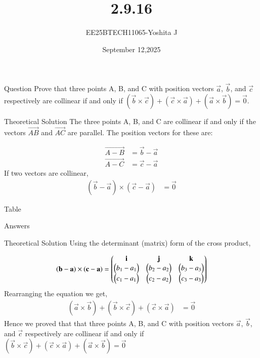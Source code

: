 \documentclass{beamer}
\begin{document}
\title 
{2.9.16}
\date{September 12,2025}


\author 
{EE25BTECH11065-Yoshita J}






\frame{\titlepage}
\begin{frame}{Question}
Prove that three points A, B, and C with position vectors $\vec{a}$, $\vec{b}$, and $\vec{c}$ respectively are collinear if and only if $(\vec{b} \times \vec{c}) + (\vec{c} \times \vec{a}) + (\vec{a} \times \vec{b}) = \vec{0}$.\\

\end{frame}

\begin{frame}{Theoretical Solution}
The three points A, B, and C are collinear if and only if the vectors $\vec{AB}$ and $\vec{AC}$ are parallel. The position vectors for these are:

\begin{align*}
    \vec{A-B} &= \vec{b} - \vec{a} \\
    \vec{A-C} &= \vec{c} - \vec{a}
\end{align*}
If two vectors are collinear,
\begin{align}
    
    (\vec{b} - \vec{a}) \times (\vec{c} - \vec{a}) &= \vec{0}
\end{align}
\end{frame}
\begin{frame}{Table}
\begin{table}[H]    
  \centering
  
  \caption{Answers}
  \label{Answers}
\end{table}
\end{frame}
\begin{frame}{Theoretical Solution}
Using the determinant (matrix) form of the cross product,

\[
(\mathbf{b}-\mathbf{a}) \times (\mathbf{c}-\mathbf{a}) =
\begin{pmatrix}
\mathbf{i} & \mathbf{j} & \mathbf{k} \\
\begin{pmatrix}b_1-a_1\end{pmatrix} & \begin{pmatrix}b_2-a_2\end{pmatrix} & \begin{pmatrix}b_3-a_3\end{pmatrix} \\
\begin{pmatrix}c_1-a_1\end{pmatrix} & \begin{pmatrix}c_2-a_2\end{pmatrix} & \begin{pmatrix}c_3-a_3\end{pmatrix}
\end{pmatrix}
\]
Rearranging the equation we get,
\begin{align}
    (\vec{a} \times \vec{b}) + (\vec{b} \times \vec{c}) + (\vec{c} \times \vec{a}) &= \vec{0}
\end{align}
Hence we proved that that three points A, B, and C with position vectors $\vec{a}$, $\vec{b}$, and $\vec{c}$ respectively are collinear if and only if $(\vec{b} \times \vec{c}) + (\vec{c} \times \vec{a}) + (\vec{a} \times \vec{b}) = \vec{0}$
\end{frame}
\end{document}
